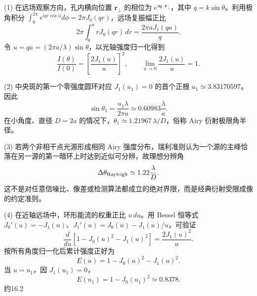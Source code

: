 (1) 在远场观察方向，孔内横向位置 \(\boldsymbol r_\perp\) 的相位为 \(e^{i\boldsymbol q\cdot\boldsymbol r_\perp}\)，其中 \(q=k\sin\theta\)。利用极角积分 \(\int_0^{2\pi}e^{iqr\cos\phi}d\phi=2\pi J_0(qr)\)，远场复振幅正比
\[
2\pi\int_0^a rJ_0(qr)\,dr=\frac{2\pi aJ_1(qa)}q.
\]
令 \(u=qa=(2\pi a/\lambda)\sin\theta\)，以光轴强度归一化得到
\[
\frac{I(\theta)}{I(0)}
=\left[\frac{2J_1(u)}u\right]^2,
\qquad \lim_{u\to0}\frac{2J_1(u)}u=1.
\]

(2) 中央斑的第一个零强度圆环对应 \(J_1(u_1)=0\) 的首个正根 \(u_1\simeq3.83170597\)。因此
\[
\sin\theta_1=\frac{u_1\lambda}{2\pi a}
\simeq0.60983\frac{\lambda}{a}.
\]
在小角度、直径 \(D=2a\) 的情况下，\(\theta_1\simeq1.21967\,\lambda/D\)，俗称 Airy 衍射极限角半径。

(3) 若两个非相干点光源形成相同 Airy 强度分布，瑞利准则认为一个源的主峰恰落在另一源的第一暗环上时达到近似可分辨，故理想分辨角
\[
\Delta\theta_{\rm Rayleigh}\simeq1.22\frac{\lambda}{D}.
\]
这不是对任意信噪比、像差或检测算法都成立的绝对界限，而是经典衍射受限成像的约定准则。

(4) 在近轴远场中，环形能流的权重正比 \(u\,du\)。用 Bessel 恒等式 \(J_0'(u)=-J_1(u)\)、\(J_1'(u)=J_0(u)-J_1(u)/u\)，可验证
\[
\frac{d}{du}[1-J_0(u)^2-J_1(u)^2]=\frac{2J_1(u)^2}{u}.
\]
按所有角度归一化后累计强度正好为
\[
E(u)=1-J_0(u)^2-J_1(u)^2.
\]
当 \(u=u_1\)，因 \(J_1(u_1)=0\)，
\[
E(u_1)=1-J_0(u_1)^2\simeq0.8378 .
\]
约16.2%
